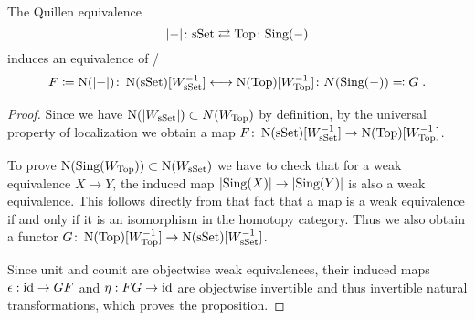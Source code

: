 \begin{prop}
    The Quillen equivalence 
    \begin{equation*}
        \lvert-\rvert\colon\text{sSet}\rightleftarrows\text{Top}\colon\text{Sing}(-)
    \end{equation*}
    induces an equivalence of \inftycats/ 
    \begin{equation*}
        F\coloneqq\operatorname{N}(\lvert-\rvert)\colon \operatorname{N}(\text{sSet})\lbrack W_{\text{sSet}}^{-1}\rbrack\longleftrightarrow\operatorname{N}(\text{Top})\lbrack W_{\text{Top}}^{-1}\rbrack\colon N(\text{Sing}(-))\eqqcolon G\;.
    \end{equation*}
    \begin{proof}
        Since we have $\operatorname{N}(\lvert W_{\text{sSet}}\rvert)\subset N(W_{\text{Top}})$ by definition, by the universal property of localization we obtain a map $F\colon \operatorname{N}(\text{sSet})\lbrack W_{\text{sSet}}^{-1}\rbrack\to\operatorname{N}(\text{Top})\lbrack W_{\text{Top}}^{-1}\rbrack$.

        To prove $\operatorname{N}(\text{Sing}(W_{\text{Top}}))\subset\operatorname{N}(W_{\text{sSet}})$ we have to check that for a weak equivalence $X\to Y$, the induced map $\lvert\text{Sing}(X)\rvert\to \lvert\text{Sing}(Y)\rvert$ is also a weak equivalence.
        This follows directly from that fact that a map is a weak equivalence if and only if it is an isomorphism in the homotopy category.
        Thus we also obtain a functor $G\colon\operatorname{N}(\text{Top})\lbrack W_{\text{Top}}^{-1}\rbrack\to\operatorname{N}(\text{sSet})\lbrack W_{\text{sSet}}^{-1}\rbrack$.

        Since unit and counit are objectwise weak equivalences, their induced maps $\epsilon:\text{id}\to GF$ and $\eta:FG\to \text{id}$ are objectwise invertible and thus invertible natural transformations, which proves the proposition. %
    \end{proof}
\end{prop}
